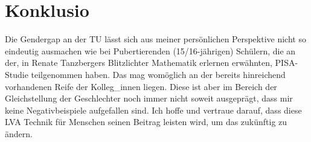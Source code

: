\documentclass{article}
\newcommand{\Quote}[1]{\glqq #1\grqq{}}
\begin{document}
\section*{Konklusio}

Die Gendergap an der TU lässt sich aus meiner persönlichen Perspektive nicht so eindeutig ausmachen wie bei Pubertierenden (15/16-jährigen) Schülern, die an der, in \Quote{Renate Tanzbergers Blitzlichter Mathematik erlernen} erwähnten, PISA-Studie teilgenommen haben.
Das mag womöglich an der bereits hinreichend vorhandenen Reife der Kolleg\_innen liegen.
Diese ist aber im Bereich der Gleichstellung der Geschlechter noch immer nicht soweit ausgeprägt, dass mir keine Negativbeispiele aufgefallen sind.
Ich hoffe und vertraue darauf, dass diese LVA \Quote{Technik für Menschen} seinen Beitrag leisten wird, um das zukünftig zu ändern.
\end{document}
